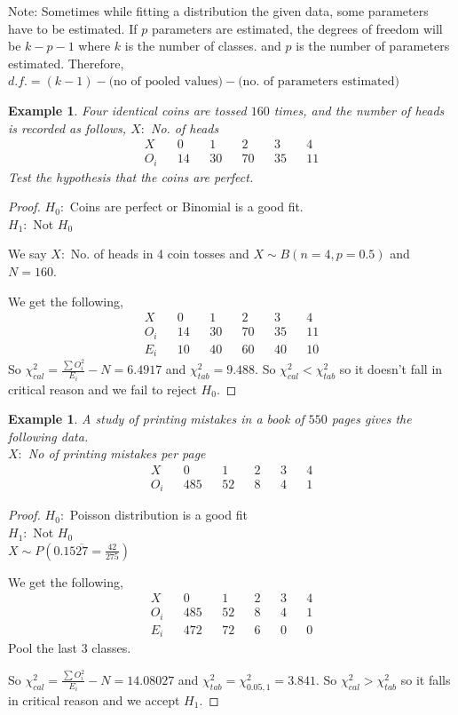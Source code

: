 \documentclass[oneside,11pt,pdftex]{book}%
\numberwithin{equation}{section}
\newtheorem{example}[theorem]{Example}
\numberwithin{section}{chapter}
\numberwithin{equation}{chapter}
\begin{document}
Note: Sometimes while fitting a distribution the given data, some parameters have to be estimated. If $ p $ parameters are estimated, the degrees of freedom will be $ k-p-1 $ where $ k $ is the number of classes. and $ p $ is the number of parameters estimated.
Therefore, $ d.f.=(k-1) - \text{(no of pooled values)}-\text{(no. of parameters estimated)}$

\begin{example}
	Four identical coins are tossed $ 160 $ times, and the number of heads is recorded as follows,
	$ X: $ No. of heads
	\begin{align*}
		X && 0 && 1 && 2 && 3 && 4\\
		O_i && 14 && 30 && 70 && 35 && 11
	\end{align*}
	Test the hypothesis that the coins are perfect.
\end{example}
\begin{proof}
	$ H_0: $ Coins are perfect or Binomial is a good fit.\\
	$ H_1: $ Not $ H_0 $
	
	We say $ X: $ No. of heads in 4 coin tosses and $ X \sim B(n=4,p=0.5) $ and $ N=160 $.
	
	We get the following,
	\begin{align*}
		X && 0 && 1 && 2 && 3 && 4\\
		O_i && 14 && 30 && 70 && 35 && 11\\
		E_i && 10 && 40 && 60 && 40 && 10
	\end{align*}
	So $ \chi^2_{cal} = \frac{\sum O_i^2}{E_i}-N=6.4917$ and $ \chi^2_{tab} = 9.488$. So $ \chi^2_{cal} < \chi^2_{tab}$ so it doesn't fall in critical reason and we fail to reject $ H_0 $.
\end{proof}

\begin{example}
	A study of printing mistakes in a book of $ 550 $ pages gives the following data.\\
	$ X: $ No of printing mistakes per page
	\begin{align*}
		X && 0 && 1 && 2 && 3 && 4\\
		O_i && 485 && 52 && 8 && 4 && 1
	\end{align*}
\end{example}
\begin{proof}
	$ H_0: $ Poisson distribution is a good fit\\
	$H_1:$ Not $ H_0 $\\
	$ X \sim P(0.15\overline{27}=\frac{42}{275}) $
	
	We get the following,
	\begin{align*}
		X && 0 && 1 && 2 && 3 && 4\\
		O_i && 485 && 52 && 8 && 4 && 1\\
		E_i && 472 && 72 && 6 && 0 && 0
	\end{align*}
	Pool the last 3 classes.
	
	
	So $ \chi^2_{cal} = \frac{\sum O_i^2}{E_i}-N=14.08027$ and $ \chi^2_{tab}=\chi^2_{0.05,1} = 3.841	$. So $ \chi^2_{cal} > \chi^2_{tab}$ so it falls in critical reason and we accept $ H_1 $.
\end{proof}
\end{document}
